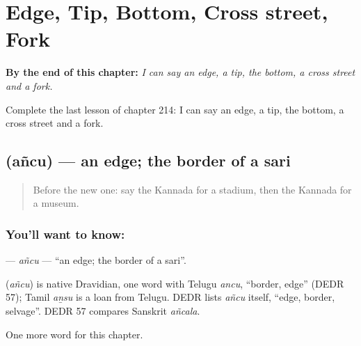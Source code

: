 
\chapter{Edge, Tip, Bottom, Cross street, Fork}
\label{ch:ka-edge-tip-bottom-cross-street-fork}

\begin{chapteropening}
\textbf{By the end of this chapter:} \emph{I can say an edge, a tip, the bottom, a cross street and a fork.}

Complete the last lesson of chapter 214: I can say an edge, a tip, the bottom, a cross street and a fork.
\end{chapteropening}

\section[\texorpdfstring{\kn{ಅಂಚು} (añcu)}{ಅಂಚು (añcu)}]{ (añcu) — an edge; the border of a sari}

\label{lesson:KA-C214-ancu}



\begin{quote}
Before the new one: say the Kannada for a stadium, then the Kannada for a museum.
\end{quote}

\subsection*{You'll want to know: }
\textbf{} — \emph{añcu} — \textquotedblleft{}an edge; the border of a sari\textquotedblright{}.

\begin{cousinweb}
\textbf{} (\emph{añcu}) is native Dravidian, one word with Telugu \emph{ancu}, \textquotedblleft{}border, edge\textquotedblright{} (DEDR 57); Tamil \emph{aṉsu} is a loan from Telugu. DEDR lists \emph{añcu} itself, \textquotedblleft{}edge, border, selvage\textquotedblright{}. DEDR 57 compares Sanskrit \emph{añcala}.
\end{cousinweb}

\begin{grammarlens}[title={What you've built}]
One more word for this chapter.
\end{grammarlens}

